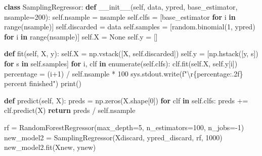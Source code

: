 \documentclass[11pt]{jsarticle}
\newenvironment{Shaded}{}{}
\newcommand{\KeywordTok}[1]{\textcolor[rgb]{0.00,0.44,0.13}{\textbf{{#1}}}}
\newcommand{\DecValTok}[1]{\textcolor[rgb]{0.25,0.63,0.44}{{#1}}}
\newcommand{\CharTok}[1]{\textcolor[rgb]{0.25,0.44,0.63}{{#1}}}
\newcommand{\FunctionTok}[1]{\textcolor[rgb]{0.02,0.16,0.49}{{#1}}}
\newcommand{\NormalTok}[1]{{#1}}
\newcommand{\SpecialCharTok}[1]{\textcolor[rgb]{0.25,0.44,0.63}{{#1}}}
\newcommand{\SpecialStringTok}[1]{\textcolor[rgb]{0.73,0.40,0.53}{{#1}}}
\newcommand{\VariableTok}[1]{\textcolor[rgb]{0.10,0.09,0.49}{{#1}}}
\newcommand{\ControlFlowTok}[1]{\textcolor[rgb]{0.00,0.44,0.13}{\textbf{{#1}}}}
\newcommand{\OperatorTok}[1]{\textcolor[rgb]{0.40,0.40,0.40}{{#1}}}
\newcommand{\BuiltInTok}[1]{{#1}}
\begin{document}
    \begin{Shaded}
\begin{Highlighting}[]
\KeywordTok{class}\NormalTok{ SamplingRegressor:}
    \KeywordTok{def} \FunctionTok{__init__}\NormalTok{(}\VariableTok{self}\NormalTok{, data, ypred, base_estimator, nsample}\OperatorTok{=}\DecValTok{200}\NormalTok{):}
        \VariableTok{self}\NormalTok{.nsample }\OperatorTok{=}\NormalTok{ nsample}
        \VariableTok{self}\NormalTok{.clfs }\OperatorTok{=}\NormalTok{ [base_estimator }\ControlFlowTok{for}\NormalTok{ i }\KeywordTok{in} \BuiltInTok{range}\NormalTok{(nsample)]}
        \VariableTok{self}\NormalTok{.discarded }\OperatorTok{=}\NormalTok{ data}
        \VariableTok{self}\NormalTok{.samples }\OperatorTok{=}\NormalTok{ [random.binomial(}\DecValTok{1}\NormalTok{, ypred) }\ControlFlowTok{for}\NormalTok{ i }\KeywordTok{in} \BuiltInTok{range}\NormalTok{(nsample)]}
        \VariableTok{self}\NormalTok{.X }\OperatorTok{=} \VariableTok{None}
        \VariableTok{self}\NormalTok{.y }\OperatorTok{=}\NormalTok{ []}
        
    \KeywordTok{def}\NormalTok{ fit(}\VariableTok{self}\NormalTok{, X, y):}
        \VariableTok{self}\NormalTok{.X }\OperatorTok{=}\NormalTok{ np.vstack([X, }\VariableTok{self}\NormalTok{.discarded])}
        \VariableTok{self}\NormalTok{.y }\OperatorTok{=}\NormalTok{ [np.hstack([y, s]) }\ControlFlowTok{for}\NormalTok{ s }\KeywordTok{in} \VariableTok{self}\NormalTok{.samples]}
        \ControlFlowTok{for}\NormalTok{ i, clf }\KeywordTok{in} \BuiltInTok{enumerate}\NormalTok{(}\VariableTok{self}\NormalTok{.clfs):}
\NormalTok{            clf.fit(}\VariableTok{self}\NormalTok{.X, }\VariableTok{self}\NormalTok{.y[i])}
\NormalTok{            percentage }\OperatorTok{=}\NormalTok{ (i}\OperatorTok{+}\DecValTok{1}\NormalTok{) }\OperatorTok{/} \VariableTok{self}\NormalTok{.nsample }\OperatorTok{*} \DecValTok{100}
\NormalTok{            sys.stdout.write(}\SpecialStringTok{f"}\CharTok{\textbackslash{}r}\SpecialCharTok{\{}\NormalTok{percentage}\SpecialCharTok{:.2f\}}\SpecialStringTok{ percent finished"}\NormalTok{)}
        \BuiltInTok{print}\NormalTok{()}
            
    \KeywordTok{def}\NormalTok{ predict(}\VariableTok{self}\NormalTok{, X):}
\NormalTok{        preds }\OperatorTok{=}\NormalTok{ np.zeros(X.shape[}\DecValTok{0}\NormalTok{])}
        \ControlFlowTok{for}\NormalTok{ clf }\KeywordTok{in} \VariableTok{self}\NormalTok{.clfs:}
\NormalTok{            preds }\OperatorTok{+=}\NormalTok{ clf.predict(X)}
        \ControlFlowTok{return}\NormalTok{ preds }\OperatorTok{/} \VariableTok{self}\NormalTok{.nsample}
    
\NormalTok{rf }\OperatorTok{=}\NormalTok{ RandomForestRegressor(max_depth}\OperatorTok{=}\DecValTok{5}\NormalTok{, n_estimators}\OperatorTok{=}\DecValTok{100}\NormalTok{, n_jobs}\OperatorTok{=-}\DecValTok{1}\NormalTok{)}
\NormalTok{new_model2 }\OperatorTok{=}\NormalTok{ SamplingRegressor(Xdiscard, ypred_discard, rf, }\DecValTok{1000}\NormalTok{)}
\NormalTok{new_model2.fit(Xnew, ynew)}
\end{Highlighting}
\end{Shaded}
\end{document}
